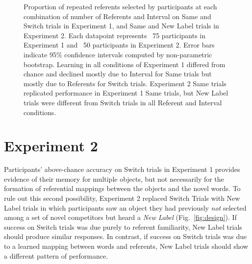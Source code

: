 \documentclass{pnastwo}
\begin{document}
\begin{article}
 \begin{figure}
	\caption{\label{fig:exp1_2_data} Proportion of repeated referents selected by participants at each combination of number of Referents and Interval on Same and Switch trials in Experiment 1, and Same and New Label trials in Experiment 2. Each datapoint represents ~75 participants in Experiment 1 and ~50 participants in Experiment 2. Error bars indicate 95\% confidence intervals computed by non-parametric bootstrap. Learning in all conditions of Experiment 1 differed from chance and declined mostly due to Interval for Same trials but mostly due to Referents for Switch trials. Experiment 2 Same trials replicated performance in Experiment 1 Same trials, but New Label trials were different from Switch trials in all Referent and Interval conditions.} 
\end{figure}
\section{Experiment 2}

Participants' above-chance accuracy on Switch trials in Experiment 1 provides evidence of their memory for multiple objects, but not necessarily for the formation of referential mappings between the objects and the novel words. To rule out this second possibility, Experiment 2 replaced Switch Trials with New Label trials in which participants saw an object they had previously \emph{not} selected among a set of novel competitors but heard a \emph{New Label} (Fig.~\ref{fig:design}). If success on Switch trials was due purely to referent familiarity, New Label trials should produce similar responses. In contrast, if success on Switch trials was due to a learned mapping between words and referents, New Label trials should show a different pattern of performance.


\end{article}
\end{document}
